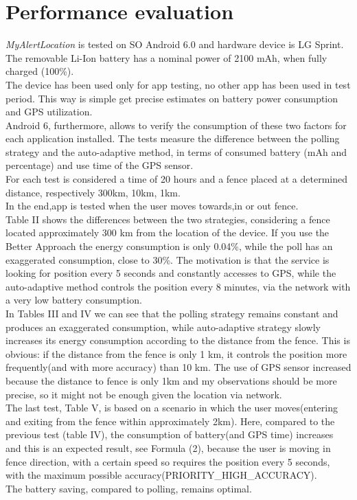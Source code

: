 \documentclass[conference]{IEEEtran}
\begin{document}
\section{Performance evaluation}
\label{sec:performance}
\textit{MyAlertLocation} is tested on SO Android 6.0 and hardware device is LG Sprint. The removable Li-Ion battery has a nominal power of 2100 mAh, when fully charged (100\%). \\
The device has been used only for app testing, no other app has been used in test period. This way is simple get precise estimates on battery power consumption and GPS utilization. \\
Android 6, furthermore, allows to verify the consumption of these two factors for each application installed.
The tests measure the difference between the polling strategy and the auto-adaptive method, in terms of consumed battery (mAh and percentage) and use time of the GPS sensor. \\
For each test is considered a time of 20 hours and a fence placed at a determined distance, respectively 300km, 10km, 1km.\\ 
In the end,app is tested when the user moves towards,in or out fence.\\
Table II shows the differences between the two strategies, considering a fence located approximately 300 km from the location of the device.
If you use the Better Approach the energy consumption is only 0.04\%, while the poll has an exaggerated consumption, close to 30\%.
The motivation is that the service is looking for position every 5 seconds and constantly accesses to GPS, 
while the auto-adaptive method controls the position every 8 minutes, via the network with a very low battery consumption. \\
In Tables III and IV we can see that the polling strategy remains constant and produces an exaggerated consumption, 
while auto-adaptive strategy slowly increases its energy consumption according to the distance from the fence.
This is obvious: if the distance from the fence is only 1 km, it controls the position more frequently(and with more accuracy) than 10 km.
The use of GPS sensor increased because the distance to fence is only 1km and my observations should be more precise, so it might not be enough given the location via network.\\
The last test, Table V, is based on a scenario in which the user moves(entering and exiting from the fence within approximately 2km). Here, compared to the previous test (table IV), 
the consumption of battery(and GPS time) increases and this is an expected result, see Formula (2), because the user is moving in fence direction, with a certain speed so
requires the position every 5 seconds, with the maximum possible accuracy(PRIORITY\_HIGH\_ACCURACY).\\
The battery saving, compared to polling, remains optimal.
\end{document}
